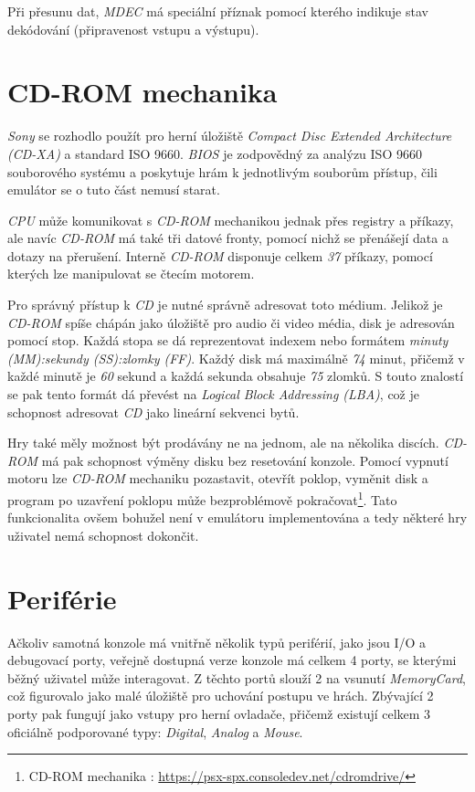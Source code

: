 Při přesunu dat, \textit{MDEC} má speciální příznak pomocí kterého indikuje stav dekódování (připravenost vstupu a výstupu).



\section{CD-ROM mechanika}

\textit{Sony} se rozhodlo použít pro herní úložiště \textit{Compact Disc Extended Architecture (CD-XA)} a standard ISO 9660.
\textit{BIOS} je zodpovědný za analýzu ISO 9660 souborového systému a poskytuje hrám k jednotlivým souborům přístup, čili emulátor se o tuto část
nemusí starat.

\textit{CPU} může komunikovat s \textit{CD-ROM} mechanikou jednak přes registry a příkazy, ale navíc \textit{CD-ROM} má také tři datové fronty,
pomocí nichž se přenášejí data a dotazy na přerušení. Interně \textit{CD-ROM} disponuje celkem \textit{37} příkazy, pomocí kterých
lze manipulovat se čtecím motorem.

Pro správný přístup k \textit{CD} je nutné správně adresovat toto médium. Jelikož je \textit{CD-ROM} spíše chápán jako
úložiště pro audio či video média, disk je adresován pomocí stop. Každá stopa se dá reprezentovat indexem
nebo formátem \textit{minuty (MM):sekundy (SS):zlomky (FF)}. Každý disk má maximálně \textit{74} minut, přičemž v každé minutě
je \textit{60} sekund a každá sekunda obsahuje \textit{75} zlomků. S touto znalostí se pak tento 
formát dá převést na \textit{Logical Block Addressing (LBA)}, což je schopnost adresovat \textit{CD} jako lineární sekvenci bytů.

Hry také měly možnost být prodávány ne na jednom, ale na několika discích. \textit{CD-ROM} má pak schopnost výměny disku
bez resetování konzole. Pomocí vypnutí motoru lze \textit{CD-ROM} mechaniku pozastavit, otevřít poklop, vyměnit disk
a program po uzavření poklopu může bezproblémově pokračovat\footnote{CD-ROM mechanika \cite{PSXSpec}: \url{https://psx-spx.consoledev.net/cdromdrive/}}. Tato funkcionalita ovšem bohužel není v emulátoru implementována a tedy některé hry uživatel nemá schopnost dokončit.

\section{Periférie}

Ačkoliv samotná konzole má vnitřně několik typů periférií, jako jsou I/O a debugovací porty, veřejně dostupná verze konzole má celkem 4 porty, 
se kterými běžný uživatel může interagovat. Z těchto portů slouží 2 na vsunutí \textit{MemoryCard}, 
což figurovalo jako malé úložiště pro uchování postupu ve hrách. 
Zbývající 2 porty pak fungují jako vstupy pro herní ovladače, přičemž existují celkem 3 oficiálně podporované typy: \textit{Digital}, \textit{Analog} a \textit{Mouse}.

